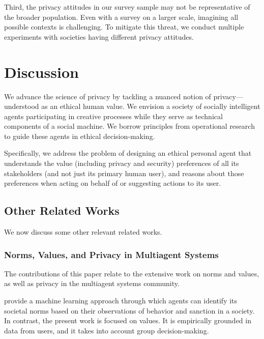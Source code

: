 Third, the privacy attitudes in our survey sample may not be representative of the broader population. Even with a survey on a larger scale, imagining all possible contexts is challenging. To mitigate this threat, we conduct multiple experiments with societies having different privacy attitudes. 

\section{Discussion}
\label{sec:discussion}
We advance the science of privacy by tackling a nuanced notion of privacy---understood as an ethical human value. We envision a society of socially intelligent agents participating in creative processes while they serve as technical components of a social machine. We borrow principles from operational research to guide these agents in ethical decision-making.

Specifically, we address the problem of designing an ethical personal agent that understands the value (including privacy and security) preferences of all its stakeholders (and not just its primary human user), and reasons about those preferences when acting on behalf of or suggesting actions to its user. 


\subsection{Other Related Works}

We now discuss some other relevant related works. 

\subsubsection{Norms, Values, and Privacy in Multiagent Systems}
The contributions of this paper relate to the extensive work on norms and values, as well as privacy in the multiagent systems community.

\citet{Cranefield+16:norm-identification} provide a machine learning approach through which agents can identify its societal norms based on their observations of behavior and sanction in a society. 
% 
In contrast, the present work is focused on values. It is empirically grounded in data from users, and it takes into account group decision-making.

